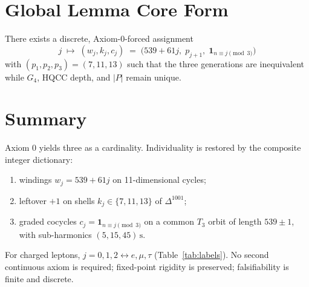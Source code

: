 \section{Global Lemma Core Form}
\label{sec:glc}

\begin{lemma}
\label{lem:glc-individuality}
There exists a discrete, Axiom-0-forced assignment
\[
j\;\mapsto\; (w_j,k_j,c_j)
\;=\;
\bigl(539+61j,\; p_{j+1},\; \mathbf{1}_{n\equiv j\pmod{3}}\bigr)
\]
with \((p_1,p_2,p_3)=(7,11,13)\) such that the three generations are inequivalent
while \(G_4\), HQCC depth, and \(|P|\) remain unique.
\end{lemma}

\section{Summary}
\label{sec:summary}

Axiom 0 yields three as a cardinality. Individuality is restored by the
composite integer dictionary:
\begin{enumerate}
  \item windings \(w_j=539+61j\) on 11-dimensional cycles;
  \item leftover \(+1\) on shells \(k_j\in\{7,11,13\}\) of \(\Delta^{1001}\);
  \item graded cocycles \(c_j=\mathbf{1}_{n\equiv j\pmod{3}}\) on a common \(T_3\)
        orbit of length \(539\pm 1\), with sub-harmonics \((5,15,45)\,\mathrm{s}\).
\end{enumerate}
For charged leptons, \(j=0,1,2\leftrightarrow e,\mu,\tau\)
(Table~\ref{tab:labels}). No second continuous axiom is required; fixed-point
rigidity is preserved; falsifiability is finite and discrete.

